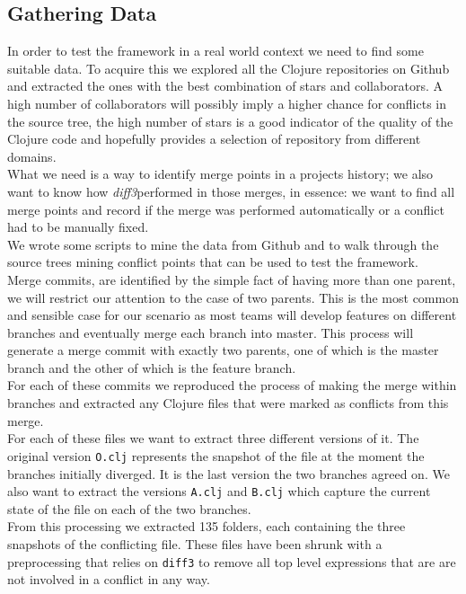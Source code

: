 \documentclass[11pt, titlepage]{article}
\newcommand{\diffthree}{\emph{diff3}}
\begin{document}
\subsection{Gathering Data}
In order to test the framework in a real world context we need to find some suitable data. To acquire this we explored all the Clojure repositories on Github and extracted the ones with the best combination of stars and collaborators. A high number of collaborators will possibly imply a higher chance for conflicts in the source tree, the high number of stars is a good indicator of the quality of the Clojure code and hopefully provides a selection of repository from different domains.
\\
What we need is a way to identify merge points in a projects history; we also want to know how \diffthree performed in those merges, in essence: we want to find all merge points and record if the merge was performed automatically or a conflict had to be manually fixed.
\\
We wrote some scripts to mine the data from Github and to walk through the source trees mining conflict points that can be used to test the framework. 
\\
Merge commits, are identified by the simple fact of having more than one parent, we will restrict our attention to the case of two parents. This is the most common and sensible case for our scenario as most teams will develop features on different branches and eventually merge each branch into master. 
This process will generate a merge commit with exactly two parents, one of which is the master branch and the other of which is the feature branch.
\\
For each of these commits we reproduced the process of making the merge within branches and extracted any Clojure files that were marked as conflicts from this merge.
\\
For each of these files we want to extract three different versions of it. The original version \texttt{O.clj} represents the snapshot of the file at the moment the branches initially diverged. It is the last version the two branches agreed on. We also want to extract the versions \texttt{A.clj} and \texttt{B.clj} which capture the current state of the file on each of the two branches.
\\
From this processing we extracted 135 folders, each containing the three snapshots of the conflicting file. These files have been shrunk with a preprocessing that relies on \texttt{diff3} to remove all  top level expressions that are are not involved in a conflict in any way.
\end{document}
